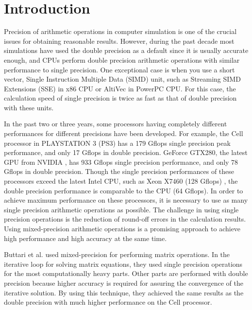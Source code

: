 

\section{Introduction}\label{sec:introduction}

Precision of arithmetic operations in computer simulation is one of
the crucial issues for obtaining reasonable results.  However, during
the past decade most simulations have used the double precision as a
default since it is usually accurate enough, and CPUs perform double
precision arithmetic operations with similar performance to single
precision.  One exceptional case is when you use a short vector,
Single Instruction Multiple Data (SIMD) unit, such as Streaming SIMD
Extensions (SSE) in x86 CPU or AltiVec in PowerPC CPU.  For this case,
the calculation speed of single precision is twice as fast as that of
double precision with these units.

In the past two or three years, some processors having completely
different performances for different precisions have been developed.
For example, the Cell processor \cite{cell} in PLAYSTATION 3 (PS3)
\cite{PS3} has a 179 Gflops single precision peak performance, and
only 17 Gflops in double precision. GeForce GTX280, the latest GPU
from NVIDIA \cite{NVIDIA}, has 933 Gflops single precision
performance, and only 78 Gflops in double precision. Though the single
precision performances of these processors exceed the latest Intel
CPU, such as Xeon X7460 (128 Gflops) \cite{XeonX7460}, the double
precision performance is comparable to the CPU (64 Gflops).  In order
to achieve maximum performance on these processors, it is necessary to
use as many single precision arithmetic operations as possible.  The
challenge in using single precision operations is the reduction of
round-off errors in the calculation results.  Using mixed-precision
arithmetic operations is a promising approach to achieve high
performance and high accuracy at the same time.

Buttari et al. \cite{Buttari} used mixed-precision for performing
matrix operations.  In the iterative loop for solving matrix
equations, they used single precision operations for the most
computationally heavy parts.  Other parts are performed with double
precision because higher accuracy is required for assuring the
convergence of the iterative solution.  By using this technique, they
achieved the same results as the double precision with much higher
performance on the Cell processor. 

